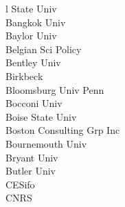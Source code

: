 \documentclass[a4paper]{article}
\begin{document}
\begin{multicols*}{2}
\begin{footnotesize}
l State Univ \\ Bangkok Univ \\ Baylor Univ \\ Belgian Sci Policy \\ Bentley Univ \\ Birkbeck \\ Bloomsburg Univ Penn \\ Bocconi Univ \\ Boise State Univ \\ Boston Consulting Grp Inc \\ Bournemouth Univ \\ Bryant Univ \\ Butler Univ \\ CESifo \\ CNRS \\
\end{footnotesize}
\end{multicols*}
\end{document}
